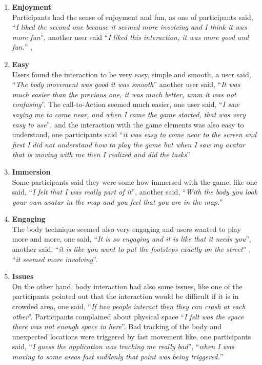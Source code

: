 \begin{enumerate}
\item	\textbf{Enjoyment}\\
Participants had the sense of enjoyment and fun, as one of participants said, ``\emph{I liked the second one because it seemed more involving and I think it was more fun}'', another user said ``\emph{I liked this interaction; it was more good and fun.}'' , 

\item	\textbf{Easy}\\
Users found the interaction to be very easy, simple and smooth, a user said, ``\emph{The body movement was good it was smooth}'' another user said, ``\emph{It was much easier than the previous one, it was much better, umm it was not confusing}''. The call-to-Action seemed much easier, one user said, ``\emph{I saw saying me to come near, and when I came the game started, that was very easy to use}'', and the interaction with the game elements was also easy to understand, one participants said ``\emph{it was easy to come near to the screen and first I did not understand how to play the game but when I saw my avatar that is moving with me then I realized and did the tasks}''

\item	\textbf{Immersion}\\
Some participants said they were some how immersed with the game, like one said, ``\emph{I felt that I was really part of it}'', another said, ``\emph{With the body you look your own avatar in the map and you feel that you are in the map.}''

\item	\textbf{Engaging}\\
The body technique seemed also very engaging and users wanted to play more and more, one said, ``\emph{It is so engaging and it is like that it needs you}'', another said, ``\emph{it is like you want to put the footsteps exactly on the street}'' , ``\emph{it seemed more involving}''. 

\item	\textbf{Issues}\\
On the other hand, body interaction had also some issues, like one of the participants pointed out that the interaction would be difficult if it is in crowded area, one said, ``\emph{If two people interact then they can crash at each other}''. Participants complained about physical space ``\emph{I felt was the space there was not enough space in here}''. Bad tracking of the body and unexpected locations were triggered by fast movement like, one participants said, ``\emph{I guess the application was tracking me really bad}'', ``\emph{when I was moving to some areas fast suddenly that point was being triggered.}''


\end{enumerate}
